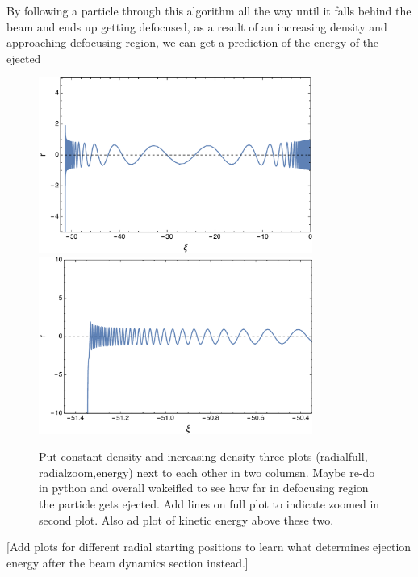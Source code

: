 By following a particle through this algorithm all the way until it falls behind the beam and ends up getting defocused, as a result of an increasing density and approaching defocusing region, we can get a prediction of the energy of the ejected 

\begin{figure}
\includegraphics[width=0.8\textwidth]{RadialEjectionFull}
\includegraphics[width=0.8\textwidth]{RadialEjectionZoom}
\caption{Put constant density and increasing density three plots (radialfull, radialzoom,energy) next to each other in two columsn. Maybe re-do in python and overall wakeifled to see how far in defocusing region the particle gets ejected. Add lines on full plot to indicate zoomed in second plot. Also ad plot of kinetic energy above these two.}
\label{RadialEjectionModel}
\end{figure}
[Add plots for different radial starting positions to learn what determines ejection energy after the beam dynamics section instead.]
